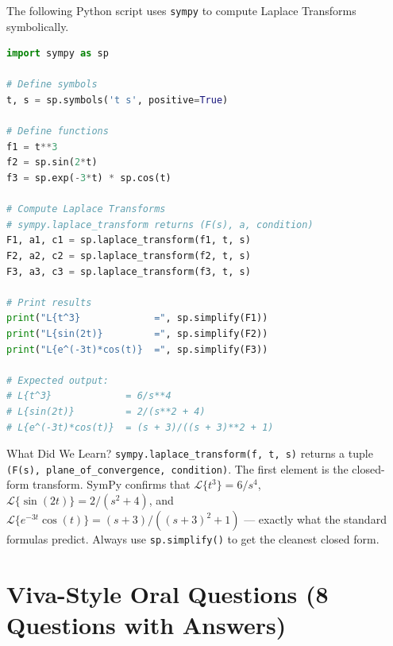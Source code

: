 \documentclass[12pt,a4paper]{article}
\begin{document}
The following Python script uses \texttt{sympy} to compute Laplace Transforms symbolically.

\begin{lstlisting}[language=Python, caption={Symbolic Laplace Transforms using SymPy}]
import sympy as sp

# Define symbols
t, s = sp.symbols('t s', positive=True)

# Define functions
f1 = t**3
f2 = sp.sin(2*t)
f3 = sp.exp(-3*t) * sp.cos(t)

# Compute Laplace Transforms
# sympy.laplace_transform returns (F(s), a, condition)
F1, a1, c1 = sp.laplace_transform(f1, t, s)
F2, a2, c2 = sp.laplace_transform(f2, t, s)
F3, a3, c3 = sp.laplace_transform(f3, t, s)

# Print results
print("L{t^3}             =", sp.simplify(F1))
print("L{sin(2t)}         =", sp.simplify(F2))
print("L{e^(-3t)*cos(t)}  =", sp.simplify(F3))

# Expected output:
# L{t^3}             = 6/s**4
# L{sin(2t)}         = 2/(s**2 + 4)
# L{e^(-3t)*cos(t)}  = (s + 3)/((s + 3)**2 + 1)
\end{lstlisting}

\begin{learnbox}{What Did We Learn?}
\texttt{sympy.laplace\_transform(f, t, s)} returns a tuple \texttt{(F(s), plane\_of\_convergence, condition)}. The first element is the closed-form transform. SymPy confirms that $\mathcal{L}\{t^3\} = 6/s^4$, $\mathcal{L}\{\sin(2t)\} = 2/(s^2+4)$, and $\mathcal{L}\{e^{-3t}\cos(t)\} = (s+3)/((s+3)^2+1)$ --- exactly what the standard formulas predict. Always use \texttt{sp.simplify()} to get the cleanest closed form.
\end{learnbox}

\section{Viva-Style Oral Questions (8 Questions with Answers)}
\end{document}
